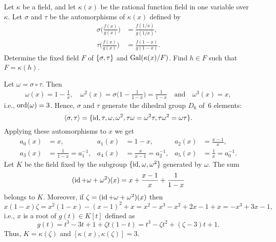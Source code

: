 \begin{probl}
    Let\/ $\kappa$ be a field, and let\/ $\kappa(x)$ be the rational function field in one variable over\/ $\kappa$. Let\/ $\sigma$ and\/ $\tau$ be the automorphisms of\/ $\kappa(x)$ defined by
    \begin{align*}
        \sigma\Big(\frac{f(x)}{g(x)}\Big) &= \frac{f(1/x)}{g(1/x)},\\
        \tau\Big(\frac{f(x)}{g(x)}\Big) &= \frac{f(1-x)}{g(1-x)}.
    \end{align*}
    Determine the fixed field\/ $F$ of\/ $\{\sigma,\tau\}$ and\/ $\operatorname{Gal}(\kappa(x)/F)$. Find\/ $h\in F$ such that\/ $F=\kappa(h)$.
\end{probl}

\begin{solution}
    Let $\omega=\sigma\circ\tau$. Then
    \begin{align*}
        \omega(x) = 1-\frac1x,\quad
        \omega^2(x) = \sigma\Big(1-\frac1{1-x}\Big) = \frac1{1-x}
        \quad\text{and}\quad \omega^3(x)=x,
    \end{align*}
    i.e., ${\rm ord}(\omega)=3$. Hence, $\sigma$ and $\tau$ generate the dihedral group $D_6$ of~$6$ elements:
    $$
        \langle\sigma,\tau\rangle = \{\operatorname{id}, \tau,\omega,\omega^2,\tau\omega=\omega^2\tau,\tau\omega^2=\omega\tau\}.
    $$
    Applying these automorphisms to $x$ we get
    \begin{align*}
        a_0(x) &= x, &a_1(x) &= 1 - x, &a_2(x) &= \frac{x-1}x,\\
        a_3(x) &= \frac1{1-x}=a_1^{-1}, &a_4(x) &= \frac x{x-1} = a_2^{-1}, &a_5(x) &= \frac1x=a_0^{-1}.
    \end{align*}
    Let $K$ be the field fixed by the subgroup $\{\operatorname{id},\omega,\omega^2\}$ generated by $\omega$. The sum
    $$
        (\operatorname{id}+\omega+\omega^2)(x) = x + \frac{x-1}x + \frac1{1-x}
    $$
    belongs to $K$. Moreover, if $\zeta = (\operatorname{id}+\omega+\omega^2)(x)$ then
    $$
        x(1-x)\zeta=x^2(1-x)-(x-1)^2+x = x^2 - x^3 - x^2 + 2x - 1 + x 
            = -x^3+3x-1,
    $$
    i.e., $x$ is a root of $g(t)\in K[t]$ defined as
    $$
        g(t) = t^3-3t+1+\zeta t(1-t) = t^3 - \zeta t^2 + (\zeta - 3)t + 1.
    $$
    Thus, $K=\kappa(\zeta)$ and $[\kappa(x),\kappa(\zeta)]=3$.


\end{solution}
